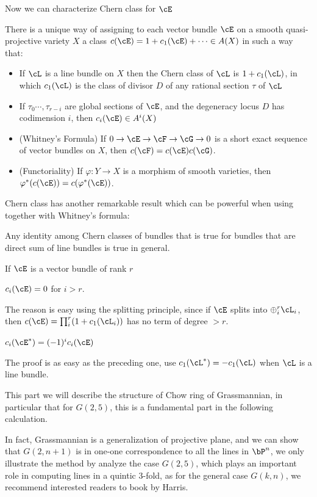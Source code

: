 \documentclass[a4paper, twoside]{article}
\begin{document}
Now we can characterize Chern class for $\cE$
\begin{thm}
	There is a unique way of assigning to each vector bundle $\cE$ on a smooth quasi-projective variety $X$ a class $c(\cE)=1+c_1(\cE)+\cdots\in A(X)$ in such a way that:
	\begin{itemize}
		\item If $\cL$ is a line bundle on $X$ then the Chern class of $\cL$ is $1+c_1(\cL)$, in which $c_1(\cL)$ is the class of divisor $D$ of any rational section $\tau$ of $\cL$
		\item If $\tau_0\cdots,\tau_{r-i}$ are global sections of $\cE$, and the degeneracy locus $D$ has codimension $i$, then $c_i(\cE)\in A^i(X)$
		\item (Whitney's Formula) If $0\rightarrow\cE\rightarrow\cF\rightarrow\cG\rightarrow 0$ is a short exact sequence of vector bundles on $X$, then $c(\cF)=c(\cE)c(\cG)$.
		\item (Functoriality) If $\varphi:Y\rightarrow X$ is a morphism of smooth varieties, then $\varphi^*(c(\cE))=c(\varphi^*(\cE))$.
	\end{itemize}
\end{thm}

Chern class has another remarkable result which can be powerful when using together with Whitney's formula:
\begin{thm}
	Any identity among Chern classes of bundles that is true for bundles that are direct sum of line bundles is true in general.
\end{thm}

If $\cE$ is a vector bundle of rank $r$
\begin{exg}
	$c_i(\cE)=0$ for $i>r$.
\end{exg}
The reason is easy using the splitting principle, since if $\cE$ splits into $\oplus_i^r\cL_i$, then $c(\cE)=\prod_i^r(1+c_1(\cL_i))$ has no term of degree $>r$.
\begin{exg}
	$c_i(\cE^*)=(-1)^ic_i(\cE)$
\end{exg}
The proof is as easy as the preceding one, use $c_1(\cL^*)=-c_1(\cL)$ when $\cL$ is a line bundle.

\label{grass}
This part we will describe the structure of Chow ring of Grassmannian, in particular that for $G(2,5)$, this is a fundamental part in the following calculation.

In fact, Grassmannian is a generalization of projective plane, and we can show that $G(2,n+1)$ is in one-one correspondence to all the lines in $\bP^n$, we only illustrate the method by analyze the case $G(2,5)$, which plays an important role in computing lines in a quintic 3-fold, as for the general case $G(k,n)$, we recommend interested readers to book by Harris.
\end{document}
